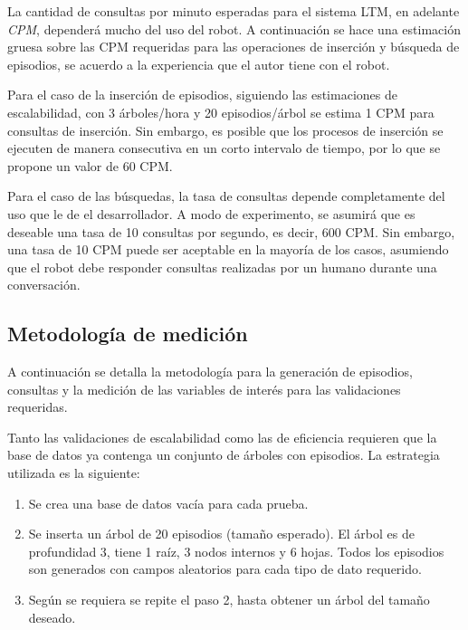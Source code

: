 La cantidad de consultas por minuto esperadas para el sistema LTM, en adelante \textit{CPM}, dependerá mucho del uso del robot. A continuación se hace una estimación gruesa sobre las CPM requeridas para las operaciones de inserción y búsqueda de episodios, se acuerdo a la experiencia que el autor tiene con el robot.

Para el caso de la inserción de episodios, siguiendo las estimaciones de escalabilidad, con 3 árboles/hora y 20 episodios/árbol se estima 1 CPM para consultas de inserción. Sin embargo, es posible que los procesos de inserción se ejecuten de manera consecutiva en un corto intervalo de tiempo, por lo que se propone un valor de 60 CPM.

Para el caso de las búsquedas, la tasa de consultas depende completamente del uso que le de el desarrollador. A modo de experimento, se asumirá que es deseable una tasa de 10 consultas por segundo, es decir, 600 CPM. Sin embargo, una tasa de 10 CPM puede ser aceptable en la mayoría de los casos, asumiendo que el robot debe responder consultas realizadas por un humano durante una conversación.

\subsection{Metodología de medición}

A continuación se detalla la metodología para la generación de episodios, consultas y la medición de las variables de interés para las validaciones requeridas.

Tanto las validaciones de escalabilidad como las de eficiencia requieren que la base de datos ya contenga un conjunto de árboles con episodios. La estrategia utilizada es la siguiente:
\begin{enumerate}
\item Se crea una base de datos vacía para cada prueba.
\item Se inserta un árbol de 20 episodios (tamaño esperado). El árbol es de profundidad 3, tiene 1 raíz, 3 nodos internos y 6 hojas. Todos los episodios son generados con campos aleatorios para cada tipo de dato requerido.
\item Según se requiera se repite el paso 2, hasta obtener un árbol del tamaño deseado.
\end{enumerate}

